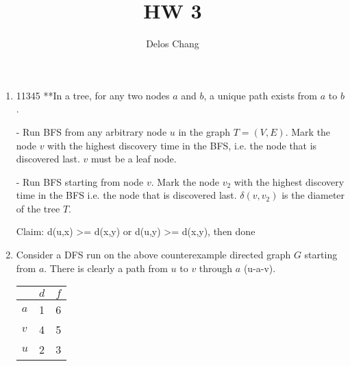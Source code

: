 \documentclass[a4paper]{report}
\title{HW 3}
\author{Delos Chang}
\date{}
\begin{document}
  \begin{enumerate}
    \item
      11345
      **In a tree, for any two nodes $a$ and $b$, a unique path exists from $a$ to $b$.

      - Run BFS from any arbitrary node $u$ in the graph $T=(V,E)$. Mark the node $v$ with the highest discovery time in the BFS, 
      i.e. the node that is discovered last. $v$ must be a leaf node. 

      - Run BFS starting from node $v$. Mark the node $v_2$ with the highest discovery time in the BFS i.e. the node that is discovered last. 
      $\delta(v,v_2)$ is the diameter of the tree $T$. 

      Claim: d(u,x) >= d(x,y)  or  d(u,y) >= d(x,y), then done




    \par
    \bigskip

    \item

      Consider a DFS run on the above counterexample directed graph $G$ starting from $a$.  
      There is clearly a path from $u$ to $v$ through $a$ (u-a-v).

      \begin{center}
        \begin{tabular}{ l | c | r }
          \hline
            & $d$ & $f$ \\ \hline
          $a$ & 1 & 6 \\
          $v$ & 4 & 5 \\
          $u$ & 2 & 3 \\
          \hline  
        \end{tabular}
      \end{center}


\end{enumerate}
\end{document}
